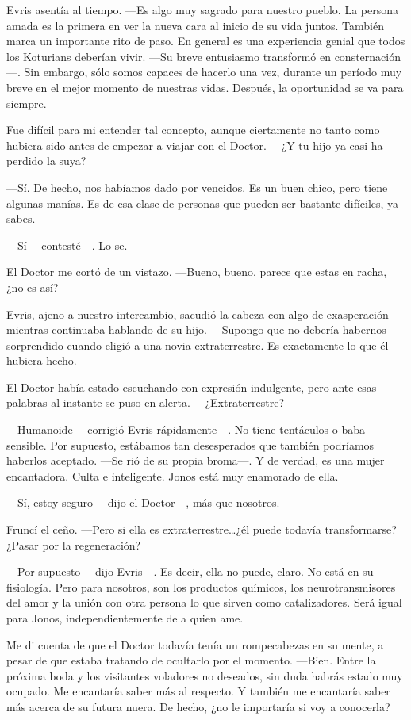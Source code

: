 Evris asentía al tiempo. ---Es algo muy sagrado para nuestro pueblo. La
persona amada es la primera en ver la nueva cara al inicio de su vida
juntos. También marca un importante rito de paso. En general es una
experiencia genial que todos los Koturians deberían vivir. ---Su breve
entusiasmo transformó en consternación---. Sin embargo, sólo somos
capaces de hacerlo una vez, durante un período muy breve en el mejor
momento de nuestras vidas. Después, la oportunidad se va para siempre.

Fue difícil para mi entender tal concepto, aunque ciertamente no tanto
como hubiera sido antes de empezar a viajar con el Doctor. ---¿Y tu hijo
ya casi ha perdido la suya?

---Sí. De hecho, nos habíamos dado por vencidos. Es un buen chico, pero
tiene algunas manías. Es de esa clase de personas que pueden ser
bastante difíciles, ya sabes.

---Sí ---contesté---. Lo se.

El Doctor me cortó de un vistazo. ---Bueno, bueno, parece que estas en
racha, ¿no es así?

Evris, ajeno a nuestro intercambio, sacudió la cabeza con algo de
exasperación mientras continuaba hablando de su hijo. ---Supongo que no
debería habernos sorprendido cuando eligió a una novia extraterrestre.
Es exactamente lo que él hubiera hecho.

El Doctor había estado escuchando con expresión indulgente, pero ante
esas palabras al instante se puso en alerta. ---¿Extraterrestre?

---Humanoide ---corrigió Evris rápidamente---. No tiene tentáculos o
baba sensible. Por supuesto, estábamos tan desesperados que también
podríamos haberlos aceptado. ---Se rió de su propia broma---. Y de
verdad, es una mujer encantadora. Culta e inteligente. Jonos está muy
enamorado de ella.

---Sí, estoy seguro ---dijo el Doctor---, más que nosotros.

Fruncí el ceño. ---Pero si ella es extraterrestre\ldots{}¿él puede
todavía transformarse? ¿Pasar por la regeneración?

---Por supuesto ---dijo Evris---. Es decir, ella no puede, claro. No
está en su fisiología. Pero para nosotros, son los productos químicos,
los neurotransmisores del amor y la unión con otra persona lo que sirven
como catalizadores. Será igual para Jonos, independientemente de a quien
ame.

Me di cuenta de que el Doctor todavía tenía un rompecabezas en su mente,
a pesar de que estaba tratando de ocultarlo por el momento. ---Bien.
Entre la próxima boda y los visitantes voladores no deseados, sin duda
habrás estado muy ocupado. Me encantaría saber más al respecto. Y
también me encantaría saber más acerca de su futura nuera. De hecho, ¿no
le importaría si voy a conocerla?

